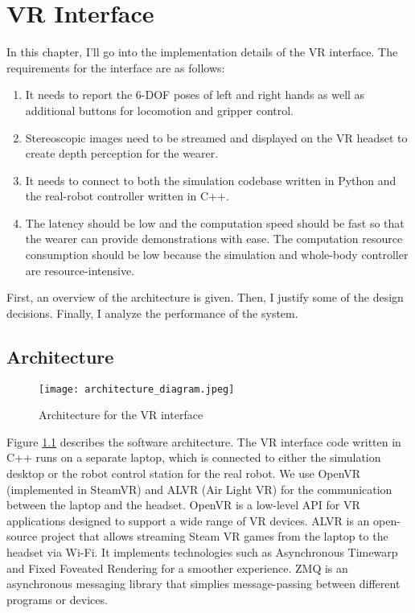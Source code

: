 \chapter{VR Interface}

In this chapter, I'll go into the implementation details of the VR interface. 
The requirements for the interface are as follows:
\begin{enumerate}
    \item It needs to report the 6-DOF poses of left and right hands as well as additional buttons for locomotion and gripper control. 
    \item Stereoscopic images need to be streamed and displayed on the VR headset to create depth perception for the wearer. 
    \item It needs to connect to both the simulation codebase written in Python and the real-robot controller written in C++. 
    \item The latency should be low and the computation speed should be fast so that the wearer can provide demonstrations with ease. The computation resource consumption should be low because the simulation and whole-body controller are resource-intensive.
\end{enumerate}

First, an overview of the architecture is given. Then, I justify some of the design decisions. Finally, I analyze the performance of the system.

\section{Architecture}

\begin{figure}
	\centering
	\texttt{[image: architecture\_diagram.jpeg]}
	\caption{Architecture for the VR interface}
    \label{fig:vr-interface}
\end{figure}

Figure \ref{fig:vr-interface} describes the software architecture. The VR interface code written in C++ runs on a separate laptop, which is connected to either the simulation desktop or the robot control station for the real robot. We use OpenVR (implemented in SteamVR) and ALVR (Air Light VR) for the communication between the laptop and the headset. OpenVR is a low-level API for VR applications designed to support a wide range of VR devices. ALVR is an open-source project that allows streaming Steam VR games from the laptop to the headset via Wi-Fi. It implements technologies such as Asynchronous Timewarp and Fixed Foveated Rendering for a smoother experience. ZMQ is an asynchronous messaging library that simplies message-passing between different programs or devices. 


